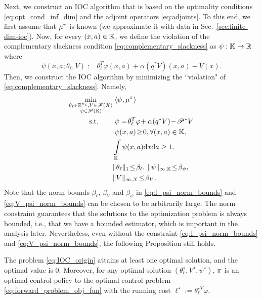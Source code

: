 Next, we construct an IOC algorithm that is based on the optimality conditions \eqref{eq:opt_cond_inf_dim} and the adjoint operators \eqref{eq:adjoints}. To this end, we first assume that $\mu^{\relax{\pi}}$ is known (we approximate it with data in Sec.~\ref{sec:finite-dim-ioc}). Now, for every $(x,a)\in\mathbb{K}$, we define the violation of the complementary slackness condition \eqref{eq:complementary_slackness} as $\psi:\mathbb{K}\rightarrow\mathbb{R}$ where
\begin{equation}
  \psi(x,a;\theta_\ell,V)\!:=\!\theta_\ell^T\varphi(x,a)\! +\alpha (q^*V)(x,a)\!-\!V(x).
\label{eq:complementary_slackness_violation}
\end{equation}
Then, we construct the IOC algorithm by minimizing the ``violation" of \eqref{eq:complementary_slackness}. Namely,
\begin{subequations}\label{eq:IOC_origin}
\begin{align}
  \min_{\substack{\theta_\ell\in\mR^{n_\ell}, V\in\mathscr{F}(X)\\\psi\in\mathscr{F}(\mK)}} 
  &\;\langle\psi,\mu^{\pitrue} \rangle\label{eq:violation_of_complementarity_slackness}\\
  \st  \qquad &\;\psi = \!\theta_\ell^T\varphi\! +\alpha (q^*V)\!-\!\proj^*V\label{eq:psi_def}\\
  &\;\psi(x,a)\!\ge\! 0,\forall (x,a)\in\mK,\label{eq:bellman_inequality_constraint}\\
  &\int_{\mK}\psi(x,a)\mathrm{d}x\mathrm{d}a \ge 1.\label{eq:regularization}\\
  &\|\theta_\ell\|_{1}\!\le\! \beta_\ell,\: \|\psi\|_{\infty,\mK}\!\le\! \beta_\psi,\label{eq:l_psi_norm_bounds}\\
  &\|V\|_{\infty,X}\!\le\! \beta_V.\label{eq:V_psi_norm_bounds}
\end{align}
\end{subequations}
Note that the norm bounds $\beta_\ell$, $\beta_V$ and $\beta_\psi$ in \eqref{eq:l_psi_norm_bounds} and \eqref{eq:V_psi_norm_bounds} can be chosen to be arbitrarily large. The norm constraint guarantees that the solutions to the optimization problem is always bounded, i.e., that we have a bounded estimator, which is important in the analysis later. Nevertheless, even without the constraint \eqref{eq:l_psi_norm_bounds} and \eqref{eq:V_psi_norm_bounds}, the following Proposition still holds.

\begin{proposition}\label{prop:well_posed_ioc_infinite_dim}
The problem \eqref{eq:IOC_origin} attains at least one optimal solution, and the optimal value is $0$. Moreover, for any optimal solution $(\theta_\ell^\star, V^\star, \psi^\star)$, $\relax{\pi}$ is an optimal control policy to the optimal control problem \eqref{eq:forward_problem_obj_fun} with the running cost $\ell^\star:=\theta_\ell^{\star T}\varphi$. 
\end{proposition}

